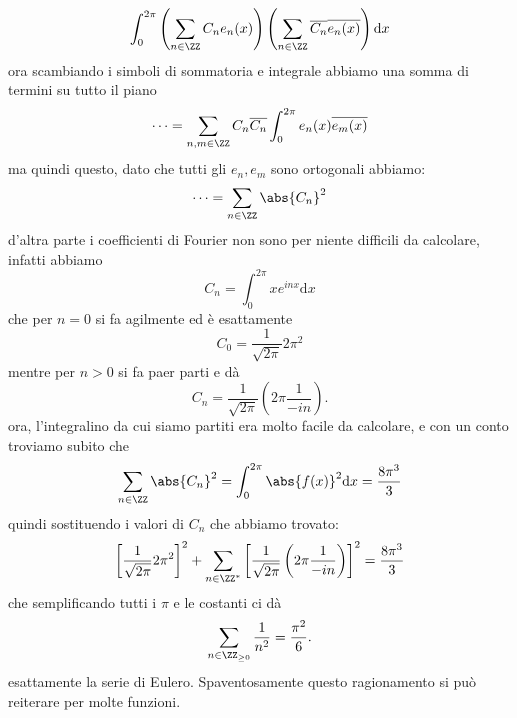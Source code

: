 \documentclass[11pt]{scrartcl}
\newcommand{\dif}{\text{d}}
\begin{document}
  $$\int_{0}^{2\pi}\left(\sum_{n\in\ZZ}C_ne_n(x)\right)\left(\sum_{n\in\ZZ}\overline{C_n}\overline{e_n(x)}\right)\dif x$$
  ora scambiando i simboli di sommatoria e integrale abbiamo una somma di termini su tutto il piano
  $$\dots=\sum_{n,m\in\ZZ}C_n\overline{C_n}\int_{0}^{2\pi}e_n(x)\overline{e_m(x)} $$
  ma quindi questo, dato che tutti gli $e_n,e_m$ sono ortogonali abbiamo:
  $$\dots=\sum_{n\in\ZZ}\abs{C_n}^2$$
  d'altra parte i coefficienti di Fourier non sono per niente difficili da calcolare, infatti abbiamo
  $$C_n=\int_{0}^{2\pi}xe^{inx}\dif x$$
  che per $n=0$ si fa agilmente ed è esattamente
  $$C_0=\frac{1}{\sqrt{2\pi}}2\pi^2$$
  mentre per $n>0$ si fa paer parti e dà
  $$C_n= \frac{1}{\sqrt{2\pi}}\left(2\pi\frac{1}{-in}\right).$$
  ora, l'integralino da cui siamo partiti era molto facile da calcolare, e con un conto troviamo subito che 
  $$\sum_{n\in\ZZ}\abs{C_n}^2=\int_0^{2\pi}\abs{f(x)}^2\dif x=\frac{8\pi^3}{3}$$
  quindi sostituendo i valori di $C_n$ che abbiamo trovato:
  $$\left[\frac{1}{\sqrt{2\pi}}2\pi^2\right]^2+\sum_{n\in\ZZ^*}\left[\frac{1}{\sqrt{2\pi}}\left(2\pi\frac{1}{-in}\right)\right]^2=\frac{8\pi^3}{3}$$
  che semplificando tutti i $\pi$ e le costanti ci dà
  $$\sum_{n\in\ZZ_{\ge 0}}\frac{1}{n^2}=\frac{\pi^2}{6}.$$
  esattamente la serie di Eulero. Spaventosamente questo ragionamento si può reiterare per molte funzioni.
  
\end{document}

